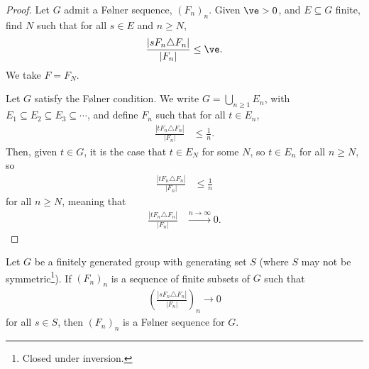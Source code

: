 \documentclass[10pt]{mypackage}
\begin{document}
\begin{proof}
  Let $G$ admit a Følner sequence, $\left(F_n\right)_n$. Given $\ve > 0$, and $E\subseteq G$ finite, find $N$ such that for all $s\in E$ and $n\geq N$,
  \begin{align*}
    \frac{\left\vert sF_n\triangle F_n \right\vert}{\left\vert F_n \right\vert} \leq \ve.
  \end{align*}
  We take $F = F_N$.\newline

  Let $G$ satisfy the Følner condition. We write $G = \bigcup_{n\geq 1}E_n$, with $E_1\subseteq E_2\subseteq E_3\subseteq\cdots$, and define $F_n$ such that for all $t\in E_n$,
  \begin{align*}
    \frac{\left\vert tF_n\triangle F_n \right\vert}{\left\vert F_n \right\vert} &\leq \frac{1}{n}.
  \end{align*}
  Then, given $t\in G$, it is the case that $t\in E_N$ for some $N$, so $t\in E_n$ for all $n\geq N$, so
  \begin{align*}
    \frac{\left\vert tF_n\triangle F_n \right\vert}{\left\vert F_n \right\vert} &\leq \frac{1}{n}
  \end{align*}
  for all $n\geq N$, meaning that
  \begin{align*}
    \frac{\left\vert tF_n\triangle F_n \right\vert}{\left\vert F_n \right\vert} &\xrightarrow{n\rightarrow\infty}0.
  \end{align*}
\end{proof}
\begin{lemma}
  Let $G$ be a finitely generated group with generating set $S$ (where $S$ may not be symmetric\footnote{Closed under inversion.}). If $\left(F_n\right)_n$ is a sequence of finite subsets of $G$ such that
  \begin{align*}
    \left(\frac{\left\vert sF_n\triangle F_n \right\vert}{\left\vert F_n \right\vert}\right)_{n}\rightarrow 0
  \end{align*}
  for all $s\in S$, then $\left(F_n\right)_n$ is a Følner sequence for $G$.
\end{lemma}
\end{document}
